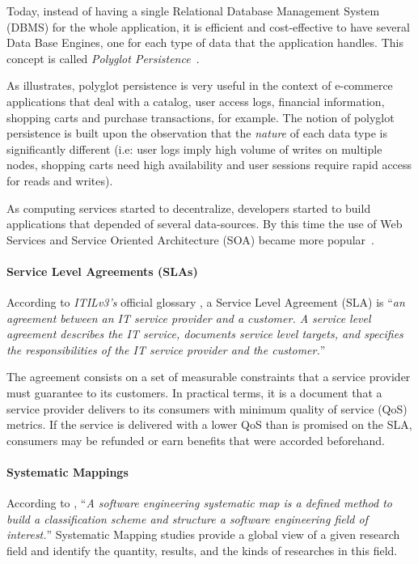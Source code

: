 \documentclass[a4paper]{IEEEtran}
\begin{document}
Today, instead of having a single Relational Database Management System (DBMS) for the whole application, it is efficient and cost-effective to have several Data Base Engines, one for each type of data that the application handles. 
This concept is called \textit{Polyglot Persistence}~\cite{sadalage2012nosql}.

As \cite{AdressingDataManagementCloud} illustrates, polyglot persistence is very useful in the context of  e-commerce applications that deal with a catalog, user access logs, financial information, shopping carts and purchase transactions, for example.
The notion of polyglot persistence is built upon the observation that the \textit{nature} of each data type is significantly different (i.e: user logs imply high volume of writes on multiple nodes, shopping carts need high availability and user sessions require rapid access for reads and writes). 

As computing services started to decentralize, developers started to build applications that depended of several data-sources. 
By this time the use of Web Services and Service Oriented Architecture (SOA) became more popular~\cite{Armbrust09m.:above}. 


\paragraph*{Service Level Agreements (SLAs)}
According to \textit{ITILv3's} official glossary \cite{itilv3glossary}, a Service Level Agreement (SLA) is ``\textit{an agreement between an IT service provider and a customer. 
A service level agreement describes the IT service, documents service level targets, and specifies the responsibilities of the IT service provider and the customer.}'' 

The agreement consists on a set of measurable constraints that a service provider must guarantee to its customers.
In practical terms, it is a document that a service provider delivers to its consumers with minimum quality of service (QoS) metrics. 
If the service is delivered with a lower QoS than is promised on the SLA, consumers may be refunded or earn benefits that were accorded beforehand.    

\paragraph*{Systematic Mappings}
According to \cite{Petersen:2008:SMS:2227115.2227123}, ``\textit{A software engineering systematic map is a defined method to build a classification scheme and structure a software engineering field of interest.}''
Systematic Mapping studies provide a global view of a given research field and identify the quantity, results, and the kinds of researches in this field.
\end{document}
